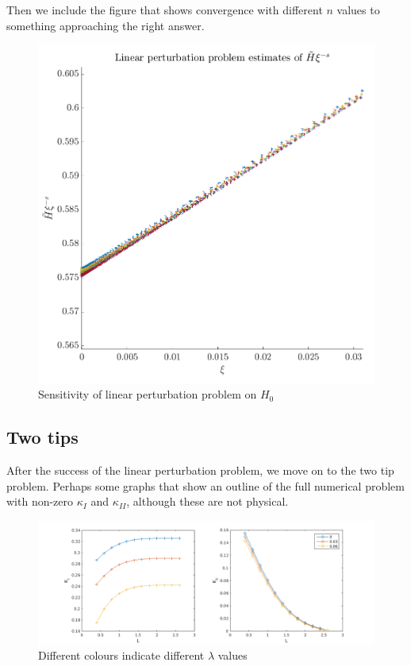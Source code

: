 \documentclass{jfm}
\begin{document}
Then we include the figure that shows convergence with different $n$ values
to something approaching the right answer.
\begin{figure}
 \centerline{
\includegraphics[scale=0.2]{./../../Graphs/linear-perturbation-new.png}}
  \caption{Sensitivity of linear perturbation problem on $H_0$}
\end{figure}

\subsection{Two tips}
After the success of the linear perturbation problem, we move on to the two tip
problem. Perhaps some graphs that show an outline of the full numerical problem
with non-zero $\kappa_I$ and $\kappa_{II}$, although these are not physical.
\begin{figure}
 \centerline{
\includegraphics[scale=0.3]{./../../Graphs/KI-KII-L.png}}
  \caption{Different colours indicate different $\lambda$ values}
\end{figure}
\end{document}
